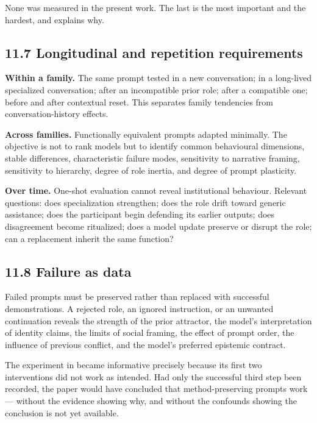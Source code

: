 None was measured in the present work. The last is the most important and the hardest, and  explains why.


\subsection*{11.7 Longitudinal and repetition requirements}
\label{sec:en:11.7}

\textbf{Within a family.} The same prompt tested in a new conversation; in a long-lived specialized conversation; after an incompatible prior role; after a compatible one; before and after contextual reset. This separates family tendencies from conversation-history effects.

\textbf{Across families.} Functionally equivalent prompts adapted minimally. The objective is not to rank models but to identify common behavioural dimensions, stable differences, characteristic failure modes, sensitivity to narrative framing, sensitivity to hierarchy, degree of role inertia, and degree of prompt plasticity.

\textbf{Over time.} One-shot evaluation cannot reveal institutional behaviour. Relevant questions: does specialization strengthen; does the role drift toward generic assistance; does the participant begin defending its earlier outputs; does disagreement become ritualized; does a model update preserve or disrupt the role; can a replacement inherit the same function?


\subsection*{11.8 Failure as data}
\label{sec:en:11.8}

Failed prompts must be preserved rather than replaced with successful demonstrations. A rejected role, an ignored instruction, or an unwanted continuation reveals the strength of the prior attractor, the model's interpretation of identity claims, the limits of social framing, the effect of prompt order, the influence of previous conflict, and the model's preferred epistemic contract.

The experiment in  became informative precisely because its first two interventions did not work as intended. Had only the successful third step been recorded, the paper would have concluded that method-preserving prompts work — without the evidence showing why, and without the confounds showing the conclusion is not yet available.


